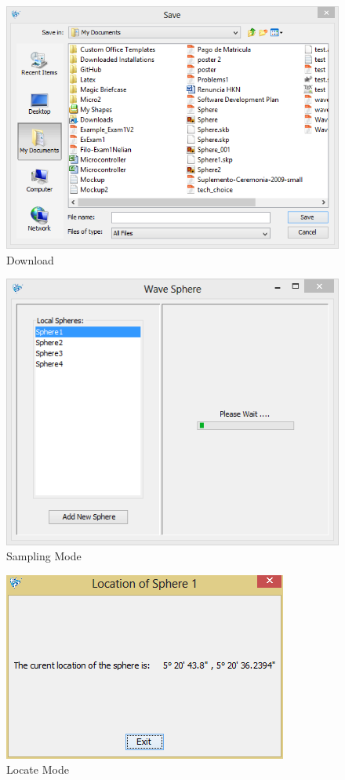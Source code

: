 \begin{figure}[H]
	\centering
	\includegraphics[scale=0.7]{img/download}
	\caption{Download \label{fig:download}}
\end{figure}

\begin{figure}[H]
	\centering
	\includegraphics[scale=0.7]{img/samplingMode}
	\caption{Sampling Mode \label{fig:samplingMode}}
\end{figure}

\begin{figure}[H]
	\centering
	\includegraphics[scale=0.7]{img/locateMode}
	\caption{Locate Mode \label{fig:locateMode}}
\end{figure}

